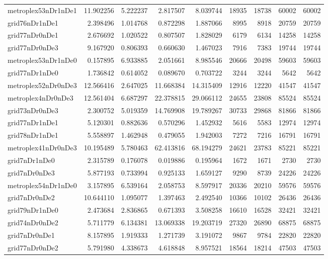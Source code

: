 \begin{longtable}{|l|r|r|r|r|r|r|r|r|}
metroplex53nDr1nDe1 & 11.902256 & 5.222237 & 2.817507 & 8.039744 & 18935 & 18738 & 60002 & 60002 \\
grid76nDr1nDe1 & 2.398496 & 1.014768 & 0.872298 & 1.887066 & 8995 & 8918 & 20759 & 20759 \\
grid77nDr0nDe1 & 2.676692 & 1.020522 & 0.807507 & 1.828029 & 6179 & 6134 & 14258 & 14258 \\
grid77nDr0nDe3 & 9.167920 & 0.806393 & 0.660630 & 1.467023 & 7916 & 7383 & 19744 & 19744 \\
metroplex53nDr1nDe0 & 0.157895 & 6.933885 & 2.051661 & 8.985546 & 20666 & 20498 & 59603 & 59603 \\
grid77nDr1nDe0 & 1.736842 & 0.614052 & 0.089670 & 0.703722 & 3244 & 3244 & 5642 & 5642 \\
metroplex52nDr0nDe3 & 12.566416 & 2.647025 & 11.668384 & 14.315409 & 12916 & 12220 & 41547 & 41547 \\
metroplex4nDr0nDe3 & 12.561404 & 6.687297 & 22.378815 & 29.066112 & 24655 & 23808 & 85524 & 85524 \\
grid73nDr0nDe3 & 2.300752 & 5.019359 & 14.769908 & 19.789267 & 30733 & 29868 & 81866 & 81866 \\
grid77nDr1nDe1 & 5.120301 & 0.882636 & 0.570296 & 1.452932 & 5616 & 5583 & 12974 & 12974 \\
grid78nDr1nDe1 & 5.558897 & 1.462948 & 0.479055 & 1.942003 & 7272 & 7216 & 16791 & 16791 \\
metroplex41nDr0nDe3 & 10.195489 & 5.780463 & 62.413816 & 68.194279 & 24621 & 23783 & 85221 & 85221 \\
grid7nDr1nDe0 & 2.315789 & 0.176078 & 0.019886 & 0.195964 & 1672 & 1671 & 2730 & 2730 \\
grid7nDr0nDe3 & 5.877193 & 0.733994 & 0.925133 & 1.659127 & 9290 & 8739 & 24226 & 24226 \\
metroplex54nDr1nDe0 & 3.157895 & 6.539164 & 2.058753 & 8.597917 & 20336 & 20210 & 59576 & 59576 \\
grid7nDr0nDe2 & 10.644110 & 1.095077 & 1.397463 & 2.492540 & 10366 & 10102 & 26436 & 26436 \\
grid79nDr1nDe0 & 2.473684 & 2.836865 & 0.671393 & 3.508258 & 16610 & 16528 & 32421 & 32421 \\
grid74nDr0nDe2 & 5.711779 & 6.134381 & 13.069338 & 19.203719 & 27320 & 26890 & 68875 & 68875 \\
grid7nDr0nDe1 & 8.157895 & 1.919333 & 1.271739 & 3.191072 & 9867 & 9784 & 22820 & 22820 \\
grid77nDr0nDe2 & 5.791980 & 4.338673 & 4.618848 & 8.957521 & 18564 & 18214 & 47503 & 47503 \\

\end{longtable}
